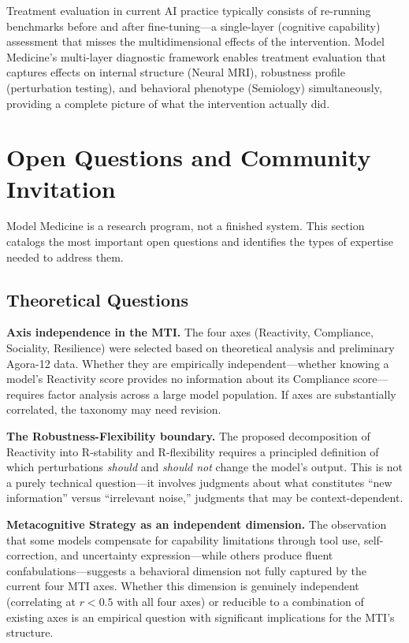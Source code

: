 \documentclass[11pt]{article}
\begin{document}
Treatment evaluation in current AI practice typically consists of re-running benchmarks before and after fine-tuning---a single-layer (cognitive capability) assessment that misses the multidimensional effects of the intervention. Model Medicine's multi-layer diagnostic framework enables treatment evaluation that captures effects on internal structure (Neural MRI), robustness profile (perturbation testing), and behavioral phenotype (Semiology) simultaneously, providing a complete picture of what the intervention actually did.


\section{Open Questions and Community Invitation}

Model Medicine is a research program, not a finished system. This section catalogs the most important open questions and identifies the types of expertise needed to address them.

\subsection{Theoretical Questions}

\textbf{Axis independence in the MTI.} The four axes (Reactivity, Compliance, Sociality, Resilience) were selected based on theoretical analysis and preliminary Agora-12 data. Whether they are empirically independent---whether knowing a model's Reactivity score provides no information about its Compliance score---requires factor analysis across a large model population. If axes are substantially correlated, the taxonomy may need revision.

\textbf{The Robustness-Flexibility boundary.} The proposed decomposition of Reactivity into R-stability and R-flexibility requires a principled definition of which perturbations \emph{should} and \emph{should not} change the model's output. This is not a purely technical question---it involves judgments about what constitutes ``new information'' versus ``irrelevant noise,'' judgments that may be context-dependent.

\textbf{Metacognitive Strategy as an independent dimension.} The observation that some models compensate for capability limitations through tool use, self-correction, and uncertainty expression---while others produce fluent confabulations---suggests a behavioral dimension not fully captured by the current four MTI axes. Whether this dimension is genuinely independent (correlating at $r < 0.5$ with all four axes) or reducible to a combination of existing axes is an empirical question with significant implications for the MTI's structure.
\end{document}
